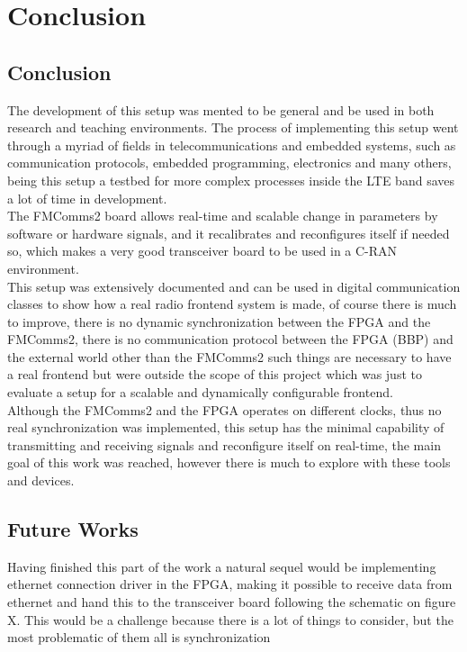 \chapter{Conclusion}
\section{Conclusion}

The development of this setup was mented to be general and be used in both
research and teaching environments. The process of implementing this setup went
through a myriad of fields in telecommunications and embedded systems, such as
communication protocols, embedded programming, electronics and many others,
being this setup a testbed for more complex processes inside the LTE band saves
a lot of time in development. \\

The FMComms2 board allows real-time and scalable change in parameters by
software or hardware signals, and it recalibrates and reconfigures itself if
needed so, which makes a very good transceiver board to be used in a C-RAN
environment.\\

This setup was extensively documented and can be used in digital communication
classes to show how a real radio frontend system is made, of course there is
much to improve, there is no dynamic synchronization between the FPGA and the
FMComms2, there is no communication protocol between the FPGA (BBP) and the
external world other than the FMComms2 such things are necessary to have a real
frontend but were outside the scope of this project which was just to evaluate a
setup for a scalable and dynamically configurable frontend.\\

Although the FMComms2 and the FPGA operates on different clocks, thus no real
synchronization was implemented, this setup has the minimal capability of
transmitting and receiving signals and reconfigure itself on real-time, the main
goal of this work was reached, however there is much to explore with these tools
and devices.

\section{Future Works}

Having finished this part of the work a natural sequel would be implementing
ethernet connection driver in the FPGA, making it possible to receive data from
ethernet and hand this to the transceiver board following the schematic on
figure X. This would be a challenge because there is a lot of things to
consider, but the most problematic of them all is synchronization
